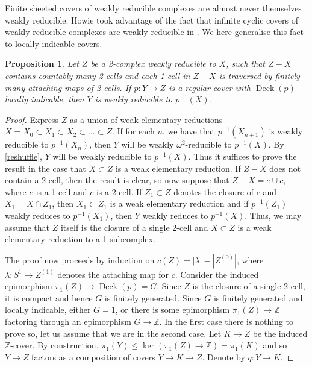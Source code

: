\documentclass{amsart}
\newtheorem{proposition}[theorem]{Proposition}
\theoremstyle{definition}
\DeclareMathOperator{\deck}{Deck}
\newcommand{\Z}{\mathbb{Z}}
\begin{document}
Finite sheeted covers of weakly reducible complexes are almost never themselves weakly reducible. Howie took advantage of the fact that infinite cyclic covers of weakly reducible complexes are weakly reducible in \cite{Ho82}. We here generalise this fact to locally indicable covers.


\begin{proposition}
\label{locally_indicable_cover}
    Let $Z$ be a 2-complex weakly reducible to $X$, such that $Z - X$ contains countably many 2-cells and each 1-cell in $Z-X$ is traversed by finitely many attaching maps of 2-cells. If $p\colon Y\to Z$ is a regular cover with $\deck(p)$ locally indicable, then $Y$ is weakly reducible to $p^{-1}(X)$.
\end{proposition}

\begin{proof}
    Express $Z$ as a union of weak elementary reductions $X = X_0\subset X_1\subset X_2\subset \ldots \subset Z$. If for each $n$, we have that $p^{-1}(X_{n+1})$ is weakly reducible to $p^{-1}(X_n)$, then $Y$ will be weakly $\omega^2$-reducible to $p^{-1}(X)$. By \cref{reshuffle}, $Y$ will be weakly reducible to $p^{-1}(X)$. Thus it suffices to prove the result in the case that $X\subset Z$ is a weak elementary reduction. If $Z - X$ does not contain a 2-cell, then the result is clear, so now suppose that $Z - X = e\cup c$, where $e$ is a 1-cell and $c$ is a 2-cell. If $Z_1\subset Z$ denotes the closure of $c$ and $X_1 = X\cap Z_1$, then $X_1\subset Z_1$ is a weak elementary reduction and if $p^{-1}(Z_1)$ weakly reduces to $p^{-1}(X_1)$, then $Y$ weakly reduces to $p^{-1}(X)$. Thus, we may assume that $Z$ itself is the closure of a single 2-cell and $X\subset Z$ is a weak elementary reduction to a 1-subcomplex. 

    The proof now proceeds by induction on $c(Z) = |\lambda| - |Z^{(0)}|$, where $\lambda\colon S^1\to Z^{(1)}$ denotes the attaching map for $c$. Consider the induced epimorphism $\pi_1(Z)\to \deck(p) = G$. Since $Z$ is the closure of a single 2-cell, it is compact and hence $G$ is finitely generated. Since $G$ is finitely generated and locally indicable, either $G = 1$, or there is some epimorphism $\pi_1(Z)\to \Z$ factoring through an epimorphism $G\to \Z$. In the first case there is nothing to prove so, let us assume that we are in the second case. Let $K\to Z$ be the induced $\Z$-cover. By construction, $\pi_1(Y)\leqslant \ker(\pi_1(Z)\to \Z) = \pi_1(K)$ and so $Y\to Z$ factors as a composition of covers $Y\to K\to Z$. Denote by $q\colon Y\to K$. 


\end{proof}
\end{document}
